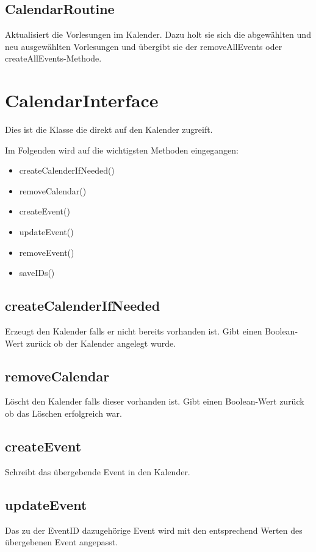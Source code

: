 \subsection{CalendarRoutine}
Aktualisiert die Vorlesungen im Kalender. Dazu holt sie sich die abgewählten und neu ausgewählten Vorlesungen und übergibt sie der removeAllEvents oder createAllEvents-Methode.

\newpage
\section{CalendarInterface}
Dies ist die Klasse die direkt auf den Kalender zugreift. 

Im Folgenden wird auf die wichtigsten Methoden eingegangen:
\begin{itemize}
     \item createCalenderIfNeeded()
     \item removeCalendar()
     \item createEvent()
     \item updateEvent()
     \item removeEvent()
     \item saveIDs()
\end{itemize}

\subsection{createCalenderIfNeeded}
Erzeugt den Kalender falls er nicht bereits vorhanden ist. Gibt einen Boolean-Wert zurück ob der Kalender angelegt wurde.

\subsection{removeCalendar}
Löscht den Kalender falls dieser vorhanden ist. Gibt einen Boolean-Wert zurück ob das Löschen erfolgreich war.

\subsection{createEvent}
Schreibt das übergebende Event in den Kalender.

\subsection{updateEvent}
Das zu der EventID dazugehörige Event wird mit den entsprechend Werten des übergebenen Event angepasst.


